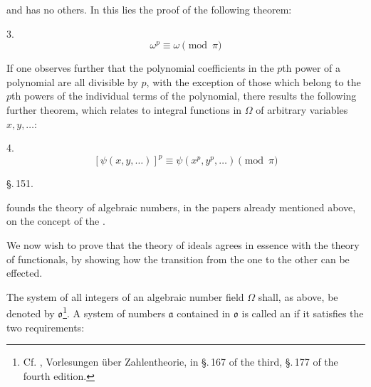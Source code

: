 and has no others. In this lies the proof of the following theorem:

3. 
\[ \omega^p \equiv \omega \pmod{\pi} \]

If one observes further that the polynomial coefficients in the $p$th power of a polynomial are all divisible by $p$, with the exception of those which belong to the $p$th powers of the individual terms of the polynomial, there results the following further theorem, which relates to integral functions in $\Omega$ of arbitrary variables $x, y, \ldots$:

4. 
\[ [\psi(x,y,\ldots)]^p \equiv \psi(x^p, y^p, \ldots) \pmod{\pi} \]

\begin{center}
\S.\,151.\\
\end{center}

 founds the theory of algebraic numbers, in the papers already mentioned above, on the concept of the .

We now wish to prove that the theory of ideals agrees in essence with the theory of functionals, by showing how the transition from the one to the other can be effected.

The system of all integers of an algebraic number field $\Omega$ shall, as above, be denoted by $\mathfrak{o}$\footnote{Cf. , Vorlesungen über Zahlentheorie, in \S.\,167 of the third, \S.\,177 of the fourth edition.}. A system of numbers $\mathfrak{a}$ contained in $\mathfrak{o}$ is called an  if it satisfies the two requirements:
